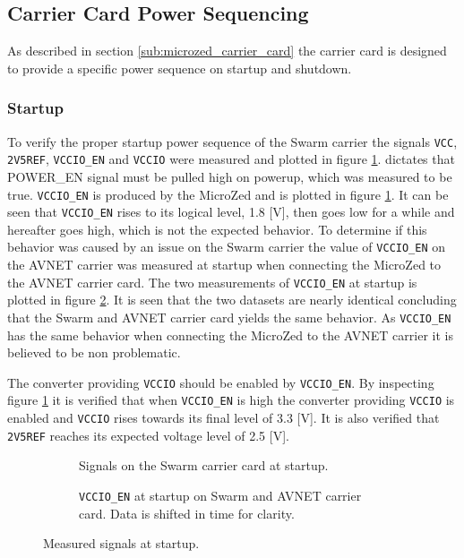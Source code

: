 \subsection{Carrier Card Power Sequencing}
As described in section \ref{sub:microzed_carrier_card} the carrier card is designed to provide a specific power sequence on startup and shutdown.

\subsubsection*{Startup}
To verify the proper startup power sequence of the Swarm carrier the signals \texttt{VCC}, \texttt{2V5REF}, \texttt{VCCIO\_EN} and \texttt{VCCIO} were measured and plotted in figure \ref{fig:startup_swarm}.
\cite{design_carrier} dictates that POWER\_EN signal must be pulled high on powerup, which was measured to be true.
\texttt{VCCIO\_EN} is produced by the MicroZed and is plotted in figure \ref{fig:startup_swarm}. 
It can be seen that \texttt{VCCIO\_EN} rises to its logical level, 1.8 [V], then goes low for a while and hereafter goes high, which is not the expected behavior.
To determine if this behavior was caused by an issue on the Swarm carrier the value of \texttt{VCCIO\_EN} on the AVNET carrier was measured at startup when connecting the MicroZed to the AVNET carrier card.
The two measurements of \texttt{VCCIO\_EN} at startup is plotted in figure \ref{fig:startup_vccioen}.
It is seen that the two datasets are nearly identical concluding that the Swarm and AVNET carrier card yields the same behavior.
As \texttt{VCCIO\_EN} has the same behavior when connecting the MicroZed to the AVNET carrier it is believed to be non problematic.

The converter providing \texttt{VCCIO} should be enabled by \texttt{VCCIO\_EN}.
By inspecting figure \ref{fig:startup_swarm} it is verified that when \texttt{VCCIO\_EN} is high the converter providing \texttt{VCCIO} is enabled and  \texttt{VCCIO} rises towards its final level of 3.3 [V].
It is also verified that \texttt{2V5REF} reaches its expected voltage level of 2.5 [V].

\begin{figure}
\centering
\begin{subfigure}[t]{.45\textwidth}
  \centering
    
  \caption{Signals on the Swarm carrier card at startup.}
  \label{fig:startup_swarm}
\end{subfigure}%
\hfill
\begin{subfigure}[t]{.45\textwidth}
  \centering
  
  \caption{\texttt{VCCIO\_EN} at startup on Swarm and AVNET carrier card. Data is shifted in time for clarity.}
  \label{fig:startup_vccioen}
\end{subfigure}
\caption{Measured signals at startup.}
\label{fig:startup_plot}
\end{figure}

